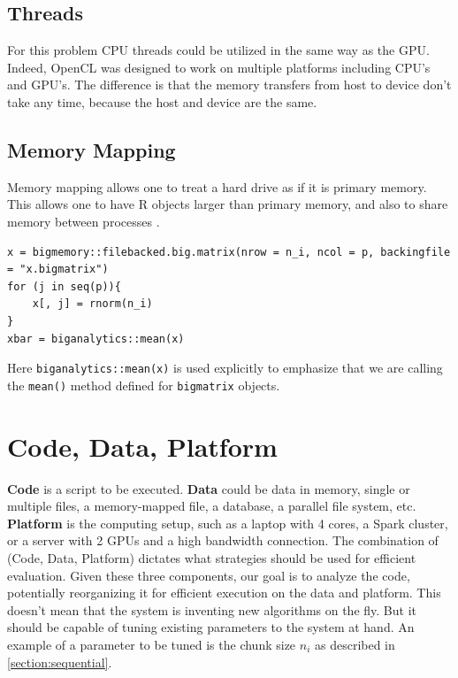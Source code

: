 \documentclass[12pt]{article}
\begin{document}
\subsection{Threads}

For this problem CPU threads could be utilized in the same way as the GPU.
Indeed, OpenCL was designed to work on multiple platforms including CPU's
and GPU's. The difference is that the memory transfers from host to device
don't take any time, because the host and device are the same.

\subsection{Memory Mapping}

Memory mapping allows one to treat a hard drive as if it is primary memory.
This allows one to have R objects larger than primary memory, and also to
share memory between processes \cite{bigmemory}.

\begin{verbatim}
x = bigmemory::filebacked.big.matrix(nrow = n_i, ncol = p, backingfile = "x.bigmatrix")
for (j in seq(p)){
    x[, j] = rnorm(n_i)
}
xbar = biganalytics::mean(x)
\end{verbatim}

Here \texttt{biganalytics::mean(x)} is used explicitly to emphasize that we
are calling the \texttt{mean()} method defined for \texttt{bigmatrix}
objects.


\section{Code, Data, Platform}

\textbf{Code} is a script to be executed.
\textbf{Data} could be data in memory, single or multiple files, a
memory-mapped file, a database, a parallel file system, etc.
\textbf{Platform} is the computing setup, such as a laptop with 4 cores, a
Spark cluster, or a server with 2 GPUs and a high bandwidth connection. The combination
of (Code, Data, Platform) dictates what strategies should be used for
efficient evaluation. Given these three components, our goal is to analyze the
code, potentially reorganizing it for efficient execution on the data and
platform. This doesn't mean that the system is inventing new algorithms on
the fly. But it should be capable of tuning existing parameters to the
system at hand. An example of a parameter to be tuned is the chunk size
$n_i$ as described in \ref{section:sequential}.
\end{document}
